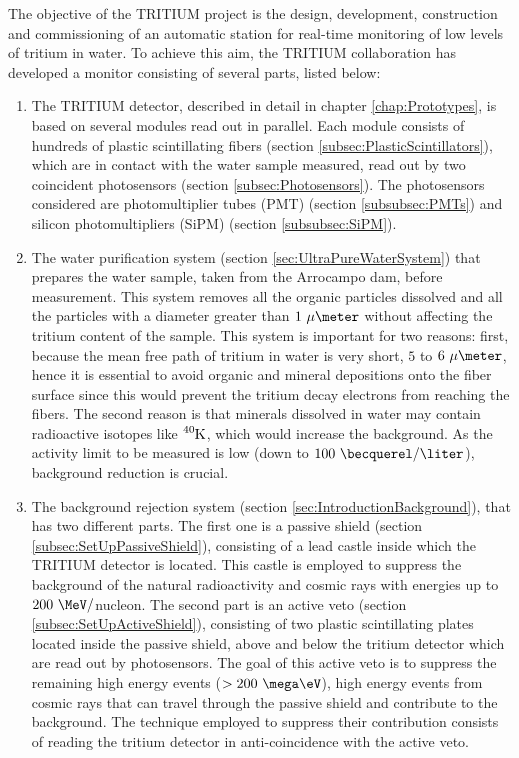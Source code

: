 The objective of the TRITIUM project is the design, development, construction and commissioning of an automatic station for real-time monitoring of low levels of tritium in water. To achieve this aim, the TRITIUM collaboration has developed a monitor consisting of several parts, listed below: 

\begin{enumerate}

\item{} The TRITIUM detector, described in detail in chapter \ref{chap:Prototypes}, is based on several modules read out in parallel. Each module consists of hundreds of plastic scintillating fibers (section \ref{subsec:PlasticScintillators}), which are in contact with the water sample measured, read out by two coincident photosensors (section \ref{subsec:Photosensors}). The photosensors considered are photomultiplier tubes (PMT) (section \ref{subsubsec:PMTs}) and silicon photomultipliers (SiPM) (section \ref{subsubsec:SiPM}).

\item{} The water purification system (section \ref{sec:UltraPureWaterSystem}) that prepares the water sample, taken from the Arrocampo dam, before measurement. This system removes all the organic particles dissolved and all the particles with a diameter greater than $1~\mu\meter$ without affecting the tritium content of the sample. This system is important for two reasons: first, because the mean free path of tritium in water is very short, $5$ to $6~\mu\meter$,  hence it is essential to avoid organic and mineral depositions onto the fiber surface since this would prevent the tritium decay electrons from reaching the fibers. The second reason is that minerals dissolved in water may contain radioactive isotopes like $\ce{^{40}K}$, which would increase the background. As the activity limit to be measured is low (down to $100~\becquerel/\liter$), background reduction is crucial.

\item{} The background rejection system (section \ref{sec:IntroductionBackground}), that has two different parts. The first one is a passive shield (section \ref{subsec:SetUpPassiveShield}), consisting of a lead castle inside which the TRITIUM detector is located. This castle is employed to suppress the background of the natural radioactivity and cosmic rays with energies up to $200~\MeV/$nucleon. The second part is an active veto (section \ref{subsec:SetUpActiveShield}), consisting of two plastic scintillating plates located inside the passive shield, above and below the tritium detector which are read out by photosensors. The goal of this active veto is to suppress the remaining high energy events ($>200~\mega\eV$), high energy events from cosmic rays that can travel through the passive shield and contribute to the background. The technique employed to suppress their contribution consists of reading the tritium detector in anti-coincidence with the active veto.


\end{enumerate}
